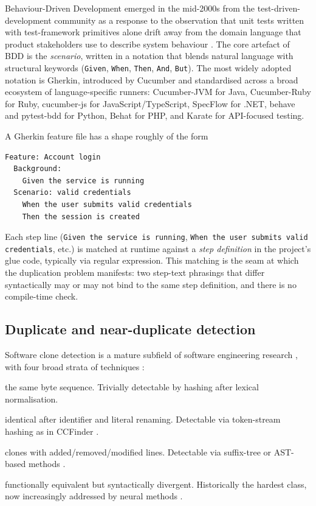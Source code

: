 \documentclass[11pt,a4paper]{article}
\begin{document}
Behaviour-Driven Development emerged in the mid-2000s from the
test-driven-development community as a response to the observation
that unit tests written with test-framework primitives alone drift
away from the domain language that product stakeholders use to
describe system behaviour \citep{north2006bdd,solis2011bdd}. The
core artefact of BDD is the \emph{scenario}, written in a notation
that blends natural language with structural keywords (\texttt{Given},
\texttt{When}, \texttt{Then}, \texttt{And}, \texttt{But}). The most
widely adopted notation is Gherkin, introduced by Cucumber
\citep{wynne2017cucumber} and standardised across a broad ecosystem
of language-specific runners: Cucumber-JVM for Java,
Cucumber-Ruby for Ruby, cucumber-js for JavaScript/TypeScript,
SpecFlow for .NET, behave and pytest-bdd for Python, Behat for
PHP, and Karate \citep{karate2020} for API-focused testing.

A Gherkin feature file has a shape roughly of the form
\begin{lstlisting}
Feature: Account login
  Background:
    Given the service is running
  Scenario: valid credentials
    When the user submits valid credentials
    Then the session is created
\end{lstlisting}
Each step line (\texttt{Given the service is running},
\texttt{When the user submits valid credentials}, etc.) is matched
at runtime against a \emph{step definition} in the project's glue
code, typically via regular expression. This matching is the seam at which
the duplication problem manifests: two step-text phrasings that differ
syntactically may or may not bind to the same step definition, and
there is no compile-time check.

\subsection{Duplicate and near-duplicate detection}

Software clone detection is a mature subfield of software engineering
research \citep{roy2007survey,kim2018cloneworld,rattan2013clonesurvey},
with four broad strata of techniques
\citep{bellon2007comparison,svajlenko2014bigclonebench}:

\begin{description}[style=nextline,leftmargin=2em]
\item[Type-1 (exact textual clones)] the same byte sequence. Trivially
detectable by hashing after lexical normalisation.
\item[Type-2 (parametric clones)] identical after identifier and
literal renaming. Detectable via token-stream hashing as in CCFinder
\citep{kamiya2002ccfinder}.
\item[Type-3 (gapped clones)] clones with added/removed/modified lines.
Detectable via suffix-tree or AST-based methods
\citep{baxter1998clonedr,jiang2007deckard}.
\item[Type-4 (semantic clones)] functionally equivalent but syntactically
divergent. Historically the hardest class, now increasingly addressed
by neural methods \citep{white2016deep,allamanis2018survey,feng2020codebert}.
\end{description}
\end{document}
